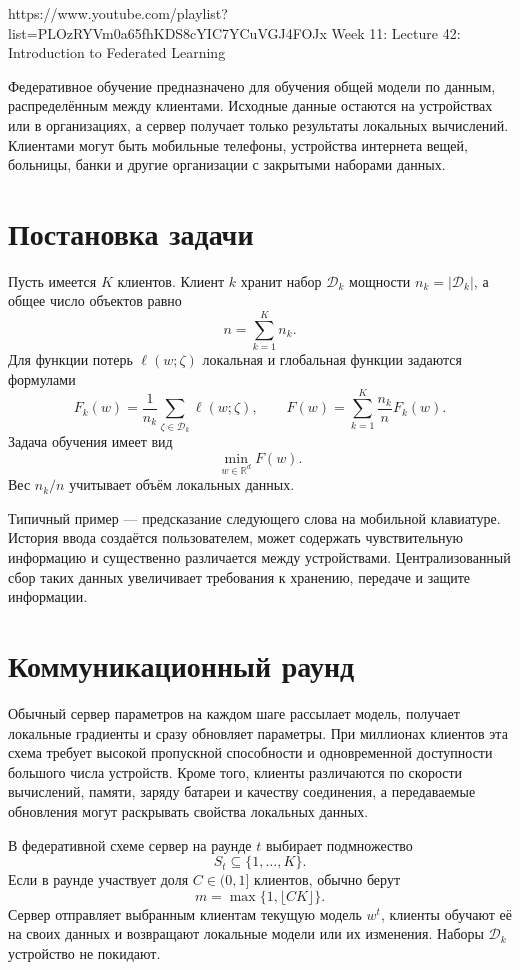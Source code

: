 
\sourcevideo
    {https://www.youtube.com/playlist?list=PLOzRYVm0a65fhKDS8cYIC7YCuVGJ4FOJx}
    {Week 11: Lecture 42: Introduction to Federated Learning}

Федеративное обучение предназначено для обучения общей модели по
данным, распределённым между клиентами. Исходные данные остаются на
устройствах или в организациях, а сервер получает только результаты
локальных вычислений. Клиентами могут быть мобильные телефоны,
устройства интернета вещей, больницы, банки и другие организации с
закрытыми наборами данных.

\section{Постановка задачи}

Пусть имеется \(K\) клиентов. Клиент \(k\) хранит набор
\(\mathcal D_k\) мощности \(n_k=\lvert\mathcal D_k\rvert\), а общее
число объектов равно
\[
    n=\sum_{k=1}^{K}n_k.
\]
Для функции потерь \(\ell(w;\zeta)\) локальная и глобальная функции
задаются формулами
\[
    F_k(w)
    =
    \frac1{n_k}
    \sum_{\zeta\in\mathcal D_k}
    \ell(w;\zeta),
    \qquad
    F(w)
    =
    \sum_{k=1}^{K}\frac{n_k}{n}F_k(w).
\]
Задача обучения имеет вид
\[
    \min_{w\in\mathbb R^d}F(w).
\]
Вес \(n_k/n\) учитывает объём локальных данных.

Типичный пример --- предсказание следующего слова на мобильной
клавиатуре. История ввода создаётся пользователем, может содержать
чувствительную информацию и существенно различается между
устройствами. Централизованный сбор таких данных увеличивает
требования к хранению, передаче и защите информации.

\section{Коммуникационный раунд}

Обычный сервер параметров на каждом шаге рассылает модель, получает
локальные градиенты и сразу обновляет параметры. При миллионах
клиентов эта схема требует высокой пропускной способности и
одновременной доступности большого числа устройств. Кроме того,
клиенты различаются по скорости вычислений, памяти, заряду батареи и
качеству соединения, а передаваемые обновления могут раскрывать
свойства локальных данных.

В федеративной схеме сервер на раунде \(t\) выбирает подмножество
\[
    S_t\subseteq\{1,\ldots,K\}.
\]
Если в раунде участвует доля \(C\in(0,1]\) клиентов, обычно берут
\[
    m=\max\{1,\lfloor CK\rfloor\}.
\]
Сервер отправляет выбранным клиентам текущую модель \(w^t\), клиенты
обучают её на своих данных и возвращают локальные модели или их
изменения. Наборы \(\mathcal D_k\) устройство не покидают.

